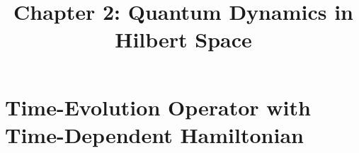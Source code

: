 \documentclass{article}
\title{Chapter 2: Quantum Dynamics in Hilbert Space} %
\begin{document}
\maketitle

\section*{Time-Evolution Operator with Time-Dependent Hamiltonian}
\end{document}
